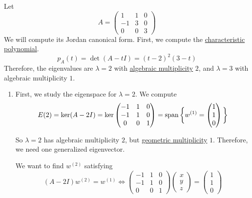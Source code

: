	\begin{example}
	  \label{ex:jnf-of-a-nontrivial-3times3-matrix}
		Let 
		\begin{equation}
			A = \begin{pmatrix}
				1 & 1 & 0 \\
				-1 & 3 & 0 \\
				0 & 0 & 3
			\end{pmatrix}
		\end{equation}
		We will compute its Jordan canonical form. First, we compute the \hyperref[def:characteristic-polynomial]{characteristic polynomial}.
		\begin{equation}
			p_A(t) = \det(A - tI) = (t - 2)^2(3 - t)
		\end{equation}
		Therefore, the eigenvalues are $\lambda = 2$ with \hyperref[def:algebraic-multiplicity]{algebraic multiplicity} $2$, and $\lambda = 3$ with algebraic multiplicity $1$.

		\begin{enumerate}
			\item First, we study the eigenspace for $\lambda = 2$. We compute
				\begin{equation}
					E(2) = \ker(A - 2I)
					= \ker \begin{pmatrix}
						-1 & 1 & 0 \\
						-1 & 1 & 0 \\
						0 & 0 & 1
					\end{pmatrix}
					= \operatorname{span} \bigg\{
					w^{(1)} =
					\begin{pmatrix}
						1 \\
						1 \\
						0
					\end{pmatrix}
					\bigg\}
				\end{equation}

				So $\lambda = 2$ has algebraic multiplicity $2$, but \hyperref[def:geometric-multiplicity]{geometric multiplicity} $1$. Therefore, we need one generalized eigenvector.

				We want to find $w^{(2)}$ satisfying
				\begin{equation}
					(A - 2I)w^{(2)} = w^{(1)}
					\iff
					\begin{pmatrix}
						-1 & 1 & 0 \\
						-1 & 1 & 0 \\
						0 & 0 & 1
					\end{pmatrix}
					\begin{pmatrix}
						x \\
						y \\
						z
					\end{pmatrix}
					=
					\begin{pmatrix}
						1 \\
						1 \\
						0
					\end{pmatrix}
				\end{equation}


\end{enumerate}
\end{example}
